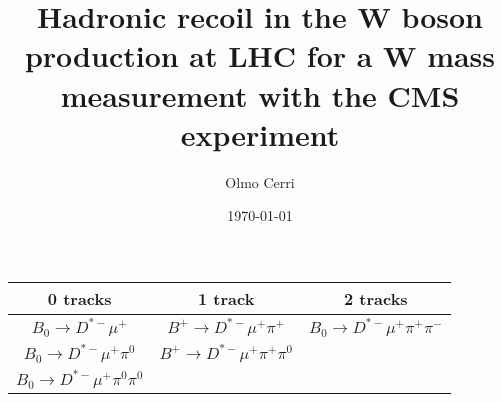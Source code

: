 \documentclass[a4paper,12pt,twoside]{book}
\title{Hadronic recoil in the W boson production at LHC for a W mass measurement with the CMS experiment}
\author{Olmo Cerri}
\affil{\href{https://www.df.unipi.it/}{Dipartimento di Fisica "E. Fermi" - Universit\`a di Pisa}}
\date{\today}
\begin{document}
\begin{center}
  \begin{tabular}{ c | c | c }
  0 tracks & 1 track & 2 tracks \\
\hline
\hline
$B_{0} \to D^{*-}\mu^+$ & $B^{+} \to D^{*-}\mu^+\pi^+$ & $B_{0} \to D^{*-}\mu^+\pi^+\pi^-$ \\
$B_{0} \to D^{*-}\mu^+\pi^0$ & $B^{+} \to D^{*-}\mu^+\pi^+\pi^0$ & \\
$B_{0} \to D^{*-}\mu^+\pi^0\pi^0$ &  & \\
\hline
  \end{tabular}
\end{center}
\end{document}
